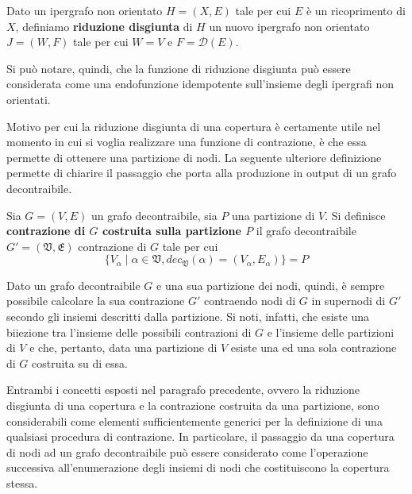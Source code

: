 \begin{definition}
    Dato un ipergrafo non orientato $H = (X, E)$ tale per cui $E$ \`e un ricoprimento di $X$,
    definiamo \textbf{riduzione disgiunta} di $H$ un nuovo ipergrafo non orientato $J = (W, F)$
    tale per cui $W = V$ e $F = \mathcal{D}(E)$.
\end{definition}

Si pu\`o notare, quindi, che la funzione di riduzione disgiunta pu\`o essere considerata come una
endofunzione idempotente sull'insieme degli ipergrafi non orientati.
\newpage


Motivo per cui la riduzione disgiunta di una copertura è certamente utile nel momento in cui si voglia
realizzare una funzione di contrazione, è che essa permette di ottenere una partizione di nodi.
La seguente ulteriore definizione permette di chiarire il passaggio che porta alla produzione in output di un grafo
decontraibile.

\begin{definition}
Sia $G = (V, E)$ un grafo decontraibile, sia $P$ una partizione di $V$.
Si definisce \textbf{contrazione di $G$ costruita sulla partizione $P$} il grafo decontraibile
$G' = (\mathfrak{V}, \mathfrak{E})$ contrazione di $G$ tale per cui
    \begin{equation*}
        \{V_\alpha \mid \alpha \in \mathfrak{V}, dec_{\mathfrak{V}}(\alpha) = (V_\alpha, E_\alpha)\} = P
    \end{equation*}
\end{definition}

Dato un grafo decontraibile $G$ e una sua partizione dei nodi, quindi, è sempre possibile calcolare la sua
contrazione $G'$ contraendo nodi di $G$ in supernodi di $G'$ secondo gli insiemi descritti dalla partizione.
Si noti, infatti, che esiste una biiezione tra l'insieme delle possibili contrazioni di $G$ e l'insieme delle
partizioni di $V$ e che, pertanto, data una partizione di $V$ esiste una ed una sola contrazione di $G$ costruita
su di essa.

\label{sec:make_decontractible_graph}

Entrambi i concetti esposti nel paragrafo precedente, ovvero la riduzione disgiunta di una copertura e la
contrazione costruita da una partizione, sono considerabili come elementi sufficientemente generici
per la definizione di una qualsiasi procedura di contrazione.
In particolare, il passaggio da una copertura
di nodi ad un grafo decontraibile può essere considerato come l'operazione successiva all'enumerazione degli
insiemi di nodi che costituiscono la copertura stessa. \newline

